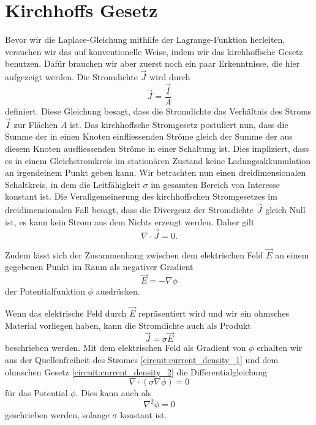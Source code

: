 %
%
%
%
\section{Kirchhoffs Gesetz
\label{circuit:section:teil1}}
Bevor wir die Laplace-Gleichung mithilfe der Lagrange-Funktion herleiten, versuchen wir das auf konventionelle Weise, indem wir  das kirchhoffsche Gesetz benutzen. 
Dafür brauchen wir aber zuerst noch ein paar Erkenntnisse, die hier aufgezeigt werden. Die Stromdichte $\vec{J}$ wird durch
\begin{equation}
	\vec{J}=\frac{\vec{I}}{A}
	\label{circuit:current_density_3}
\end{equation}
definiert. Diese Gleichung besagt, dass die Stromdichte das Verhältnis des Stroms $\vec{I}$ zur Flächen $A$ ist. 
Das kirchhoffsche Stromgesetz postuliert nun, dass die Summe der in einen Knoten einfliessenden Ströme gleich der Summe der aus diesem Knoten ausfliessenden Ströme in einer Schaltung ist. Dies impliziert, dass es in einem Gleichstromkreis im stationären Zustand keine Ladungsakkumulation an irgendeinem Punkt geben kann. Wir betrachten nun einen dreidimensionalen Schaltkreis, in dem die Leitfähigkeit $\sigma$ im gesamten Bereich von Interesse konstant ist. Die Verallgemeinerung des kirchhoffschen Stromgesetzes im dreidimensionalen Fall besagt, dass die Divergenz der Stromdichte $\vec{J}$ gleich Null ist, es kann kein Strom aus dem Nichts erzeugt werden. Daher gilt 
\begin{equation}
	\nabla \cdot  \vec{J}=0.
	\label{circuit:current_density_1}
\end{equation}

Zudem lässt sich der Zusammenhang zwischen dem elektrischen Feld $\vec{E}$ an einem gegebenen Punkt im Raum als negativer Gradient 
\begin{equation}
	\vec{E}=-\nabla \phi
	\label{circuit:current_density_4}
\end{equation}
der Potentialfunktion $\phi$ ausdrücken.

Wenn das elektrische Feld durch $\vec{E}$ repräsentiert wird und wir ein ohmsches Material vorliegen haben, kann die Stromdichte auch als Produkt  
\begin{equation}
\vec{J}=\sigma \vec{E}
\label{circuit:current_density_2}
\end{equation}
beschrieben werden.
Mit dem elektrischen Feld als Gradient von $\phi$ erhalten wir aus der Quellenfreiheit des Stromes \eqref{circuit:current_density_1} und dem ohmschen Gesetz \eqref{circuit:current_density_2} die Differentialgleichung 
\begin{equation}
	\nabla \cdot (\sigma \nabla \phi)=0
	\label{circuit:current_density_5}
\end{equation}
für das Potential $\phi$. Dies kann auch als
\begin{equation}
\nabla^2 \phi=0
\label{circuit:current_density_6}
\end{equation}
geschrieben werden, solange $\sigma$ konstant ist.

